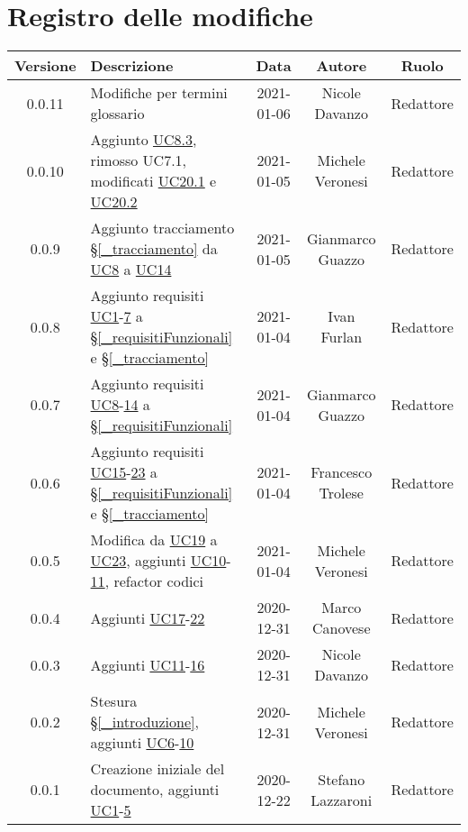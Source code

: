 \section*{Registro delle modifiche}

\begin{center}
	\begin{longtable}{|c|p{5cm}|c|c|c|}
	\hline
	\rowcolor{lighter-grayer}
	\textbf{Versione} & \textbf{Descrizione} & \textbf{Data} & \textbf{Autore} & \textbf{Ruolo} \\
	\hline
	\endfirsthead


	\hline
	0.0.11 & Modifiche per termini glossario & 2021-01-06 & Nicole Davanzo & Redattore \\
	0.0.10 & Aggiunto \hyperref[UC8.3]{UC8.3}, rimosso UC7.1, modificati \hyperref[UC20.1]{UC20.1} e \hyperref[UC20.2]{UC20.2} & 2021-01-05 & Michele Veronesi & Redattore \\
	0.0.9 & Aggiunto tracciamento \S\ref{_tracciamento} da \hyperref[UC8]{UC8} a \hyperref[UC14]{UC14} & 2021-01-05 & Gianmarco Guazzo & Redattore \\
	0.0.8 & Aggiunto requisiti \hyperref[UC1]{UC1}-\hyperref[UC7]{7} a \S\ref{_requisitiFunzionali} e \S\ref{_tracciamento} & 2021-01-04 & Ivan Furlan & Redattore \\
	0.0.7 & Aggiunto requisiti \hyperref[UC8]{UC8}-\hyperref[UC14]{14} a \S\ref{_requisitiFunzionali} & 2021-01-04 & Gianmarco Guazzo & Redattore \\
	0.0.6 & Aggiunto requisiti \hyperref[UC15]{UC15}-\hyperref[UC23]{23} a \S\ref{_requisitiFunzionali} e \S\ref{_tracciamento} & 2021-01-04 & Francesco Trolese & Redattore \\
	0.0.5 & Modifica da \hyperref[UC19]{UC19} a \hyperref[UC23]{UC23}, aggiunti \hyperref[UC10]{UC10}-\hyperref[UC11]{11}, refactor codici & 2021-01-04 & Michele Veronesi & Redattore \\
	0.0.4 & Aggiunti \hyperref[UC17]{UC17}-\hyperref[UC22]{22} & 2020-12-31 & Marco Canovese & Redattore\\
	0.0.3 & Aggiunti \hyperref[UC11]{UC11}-\hyperref[UC16]{16} & 2020-12-31 & Nicole Davanzo & Redattore\\
	0.0.2 & Stesura \S\ref{_introduzione}, aggiunti \hyperref[UC6]{UC6}-\hyperref[UC10]{10} & 2020-12-31 & Michele Veronesi & Redattore\\
    0.0.1 & Creazione iniziale del documento, aggiunti \hyperref[UC1]{UC1}-\hyperref[UC5]{5} & 2020-12-22 & Stefano Lazzaroni & Redattore\\
	\hline

	\end{longtable}
\end{center}